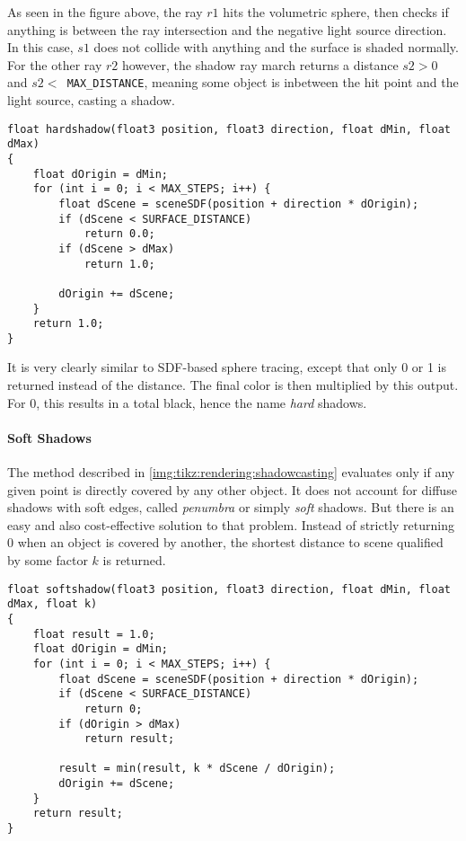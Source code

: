 \noindent
As seen in the figure above, the ray $r1$ hits the volumetric sphere, then checks if anything is between the ray intersection and the negative light source direction.
In this case, $s1$ does not collide with anything and the surface is shaded normally. 
For the other ray $r2$ however, the shadow ray march returns a distance $s2 > 0$ and $s2 < $\lstinline[language=HLSL]{ MAX_DISTANCE}, meaning some object is inbetween the hit point and the light source, casting a shadow.
\\
\begin{lstlisting}[language=HLSL, caption=Implementation of hard shadow casting., label=lst:shader:shadowcasting:hard]
float hardshadow(float3 position, float3 direction, float dMin, float dMax)
{
    float dOrigin = dMin;
    for (int i = 0; i < MAX_STEPS; i++) {
        float dScene = sceneSDF(position + direction * dOrigin);
        if (dScene < SURFACE_DISTANCE)
            return 0.0;
        if (dScene > dMax)
            return 1.0;
        
        dOrigin += dScene;
    }
    return 1.0;
}
\end{lstlisting}

\noindent
It is very clearly similar to SDF-based sphere tracing, except that only 0 or 1 is returned instead of the distance.
The final color is then multiplied by this output. For 0, this results in a total black, hence the name \textit{hard} shadows.

\paragraph{Soft Shadows}
The method described in \autoref{img:tikz:rendering:shadowcasting} evaluates only if any given point is directly covered by any other object. 
It does not account for diffuse shadows with soft edges, called \textit{\gls{penumbra}} or simply \textit{soft} shadows. But there is an easy and also cost-effective solution to that problem.
Instead of strictly returning 0 when an object is covered by another, the shortest distance to scene qualified by some factor $k$ is returned.

\begin{lstlisting}[language=HLSL, caption=Implementation of hard shadow casting., label=lst:shader:shadowcasting:hard]
float softshadow(float3 position, float3 direction, float dMin, float dMax, float k)
{
    float result = 1.0;
    float dOrigin = dMin;
    for (int i = 0; i < MAX_STEPS; i++) {
        float dScene = sceneSDF(position + direction * dOrigin);
        if (dScene < SURFACE_DISTANCE)
            return 0;
        if (dOrigin > dMax)
            return result;
        
        result = min(result, k * dScene / dOrigin);
        dOrigin += dScene;
    }
    return result;
}
\end{lstlisting}

